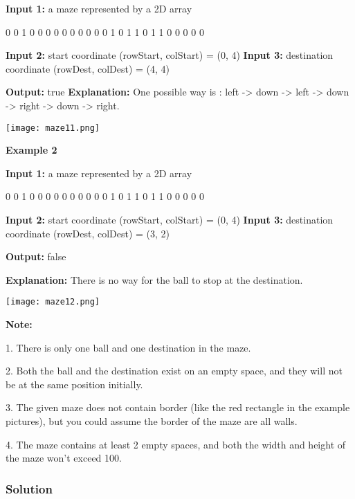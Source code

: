 \textbf{Input 1:} a maze represented by a 2D array

\begin{Code}
0 0 1 0 0
0 0 0 0 0
0 0 0 1 0
1 1 0 1 1
0 0 0 0 0
\end{Code}

\textbf{Input 2:} start coordinate (rowStart, colStart) = (0, 4)
\textbf{Input 3:} destination coordinate (rowDest, colDest) = (4, 4)

\textbf{Output:} true
\textbf{Explanation:} One possible way is : left -> down -> left -> down -> right -> down -> right.

\begin{center}
\texttt{[image: maze11.png]}\\
\end{center}

\textbf{Example 2}

\textbf{Input 1:} a maze represented by a 2D array

\begin{Code}
0 0 1 0 0
0 0 0 0 0
0 0 0 1 0
1 1 0 1 1
0 0 0 0 0
\end{Code}

\textbf{Input 2:} start coordinate (rowStart, colStart) = (0, 4)
\textbf{Input 3:} destination coordinate (rowDest, colDest) = (3, 2)

\textbf{Output:} false

\textbf{Explanation:} There is no way for the ball to stop at the destination.

\begin{center}
\texttt{[image: maze12.png]}\\
\end{center}

\textbf{Note:}

1. There is only one ball and one destination in the maze.

2. Both the ball and the destination exist on an empty space, and they will not be at the same position initially.

3. The given maze does not contain border (like the red rectangle in the example pictures), but you could assume the border of the maze are all walls.

4. The maze contains at least 2 empty spaces, and both the width and height of the maze won't exceed 100.

\subsubsection{Solution}

